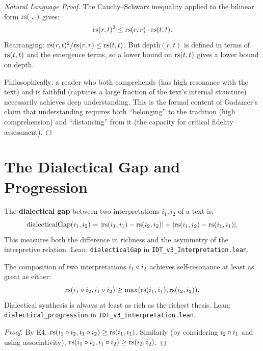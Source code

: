 \begin{proof}[Natural Language Proof]
The Cauchy--Schwarz inequality applied to the bilinear form $\mathrm{rs}(\cdot, \cdot)$
gives:
\[
\mathrm{rs}(r, t)^2 \leq \mathrm{rs}(r, r) \cdot \mathrm{rs}(t, t).
\]
Rearranging: $\mathrm{rs}(r, t)^2 / \mathrm{rs}(r, r) \leq \mathrm{rs}(t, t)$.  But
$\mathrm{depth}(r, t)$ is defined in terms of $\mathrm{rs}(t, t)$ and the
emergence terms, so a lower bound on $\mathrm{rs}(t, t)$ gives a lower bound on
depth.

Philosophically: a reader who both comprehends (has high resonance with
the text) and is faithful (captures a large fraction of the text's
internal structure) necessarily achieves deep understanding.  This
is the formal content of Gadamer's claim that understanding requires
both ``belonging'' to the tradition (high comprehension) and ``distancing''
from it (the capacity for critical fidelity assessment).
\end{proof}

\section{The Dialectical Gap and Progression}

\begin{definition}
\label{def:dialectical-gap}
The \textbf{dialectical gap} between two interpretations $i_1, i_2$ of a
text is:
\[
\mathrm{dialecticalGap}(i_1, i_2) = |\mathrm{rs}(i_1, i_1) - \mathrm{rs}(i_2, i_2)|
+ |\mathrm{rs}(i_1, i_2) - \mathrm{rs}(i_1, i_1)|.
\]
This measures both the difference in richness and the asymmetry of the
interpretive relation.
Lean: \texttt{dialecticalGap} in \texttt{IDT\_v3\_Interpretation.lean}.
\end{definition}

\begin{theorem}
\label{thm:dialectical-progression}
The composition of two interpretations $i_1 \circ i_2$ achieves
self-resonance at least as great as either:
\[
\mathrm{rs}(i_1 \circ i_2, i_1 \circ i_2) \geq \max(\mathrm{rs}(i_1, i_1), \mathrm{rs}(i_2, i_2)).
\]
Dialectical synthesis is always at least as rich as the richest thesis.
Lean: \texttt{dialectical\_progression} in \texttt{IDT\_v3\_Interpretation.lean}.
\end{theorem}

\begin{proof}
By E4, $\mathrm{rs}(i_1 \circ i_2, i_1 \circ i_2) \geq \mathrm{rs}(i_1, i_1)$.
Similarly (by considering $i_2 \circ i_1$ and using associativity),
$\mathrm{rs}(i_1 \circ i_2, i_1 \circ i_2) \geq \mathrm{rs}(i_2, i_2)$.
\end{proof}

